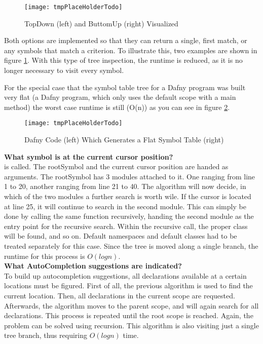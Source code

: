 \begin{figure}[H]
    \centering
    \texttt{[image: tmpPlaceHolderTodo]}
    \caption{TopDown (left) and ButtomUp (right) Visualized}
    \label{fig:impl_symboltablenav}
\end{figure}

Both options are implemented so that they can return a single, first match, or any symbols that match a criterion.
To illustrate this, two examples are shown in figure \ref{fig:impl_symboltablenav}.
With this type of tree inspection, the runtime is reduced, as it is no longer necessary to visit every symbol.

For the special case that the symbol table tree for a Dafny program was built very flat
(a Dafny program, which only uses the default scope with a main method)
the worst case runtime is still \code(O(n)) as you can see in figure \ref{fig:impl_symboltablenav_o_of_n}.

\begin{figure}[H]
    \centering
    \texttt{[image: tmpPlaceHolderTodo]}
    \caption{Dafny Code (left) Which Generates a Flat Symbol Table (right)}
    \label{fig:impl_symboltablenav_o_of_n}
\end{figure}

\textbf{What symbol is at the current cursor position?}\\
 is called.
The rootSymbol and the current cursor position are handed as arguments.
The rootSymbol has 3 modules attached to it.
One ranging from line 1 to 20, another ranging from line 21 to 40.
The algorithm will now decide, in which of the two modules a further search is worth wile.
If the cursor is located at line 25, it will continue to search in the second module.
This can simply be done by calling the same function recursively, handing the second module as the entry point for the recursive search.
Within the recursive call, the proper class will be found, and so on.
Default namespaces and default classes had to be treated separately for this case.
Since the tree is moved along a single branch, the runtime for this process is $O(logn)$.\\

\textbf{What AutoCompletion suggestions are indicated?}\\
To build up autocompletion suggestions, all declarations available at a certain locations must be figured.
First of all, the previous  algorithm is used to find the current location.
Then, all declarations in the current scope are requested.
Afterwards, the algorithm moves to the parent scope, and will again search for all declarations.
This process is repeated until the root scope is reached.
Again, the problem can be solved using recursion.
This algorithm is also visiting just a single tree branch, thus requiring $O(logn)$ time.\\

